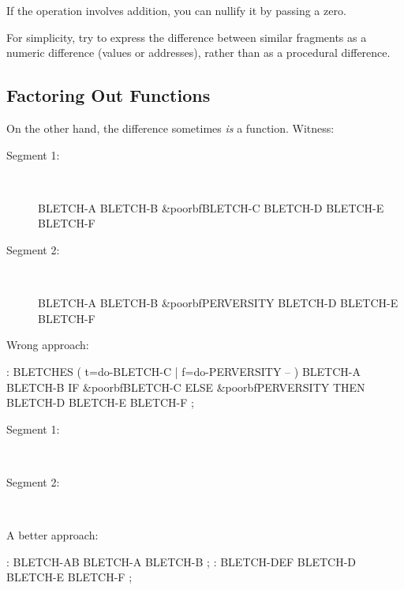 If the operation involves addition, you can nullify it by passing a
zero.

\begin{tip}
For simplicity, try to express the difference between similar
fragments as a numeric difference (values or addresses), rather than
as a procedural difference.
\end{tip}

\subsection{Factoring Out Functions}
On the other hand, the difference sometimes \emph{is} a function. Witness:

\begin{description}
\item[Segment 1:]~~
\begin{minipage}[t]{.6\hsize}
\begin{Code}[commandchars=\&\{\}]
BLETCH-A  BLETCH-B  &poorbf{BLETCH-C}
         BLETCH-D  BLETCH-E  BLETCH-F
\end{Code}
\end{minipage}
\item[Segment 2:]~~
\begin{minipage}[t]{.6\hsize}
\begin{Code}[commandchars=\&\{\}]
BLETCH-A  BLETCH-B  &poorbf{PERVERSITY}
         BLETCH-D  BLETCH-E  BLETCH-F
\end{Code}
\end{minipage}
\end{description}

\noindent Wrong approach:

\begin{Code}[commandchars=\&\{\}]
: BLETCHES  ( t=do-BLETCH-C | f=do-PERVERSITY -- ) 
   BLETCH-A  BLETCH-B  IF  &poorbf{BLETCH-C}  ELSE  &poorbf{PERVERSITY}
      THEN  BLETCH-D BLETCH-E BLETCH-F ;
\end{Code}

\begin{description}
\item[Segment 1:]~~ 
\item[Segment 2:]~~ 
\end{description}

\noindent A better approach:

\begin{Code}
: BLETCH-AB   BLETCH-A BLETCH-B ;
: BLETCH-DEF   BLETCH-D BLETCH-E BLETCH-F ;
\end{Code}

